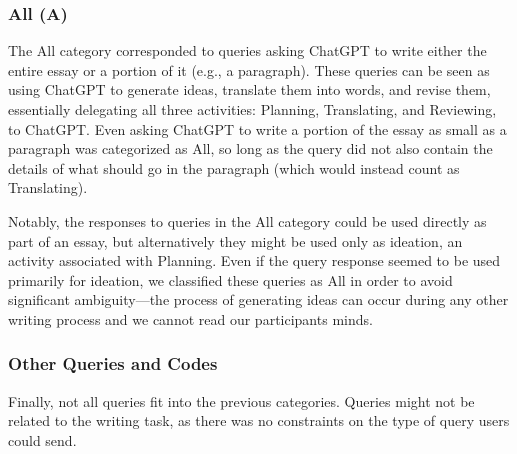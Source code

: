 \documentclass[manuscript,screen,acmsmall]{acmart}
\begin{document}
         
\subsubsection{All (A)}
The All category corresponded to queries asking ChatGPT to write either the entire essay or a portion of it (e.g., a paragraph).
These queries can be seen as using ChatGPT to generate ideas, translate them into words, and revise them, essentially delegating all three activities: Planning, Translating, and Reviewing, to ChatGPT.
Even asking ChatGPT to write a portion of the essay as small as a paragraph was categorized as All, so long as the query did not also contain the details of what should go in the paragraph (which would instead count as Translating).

Notably, the responses to queries in the All category could be used directly as part of an essay, but alternatively they might be used only as ideation, an activity associated with Planning.
Even if the query response seemed to be used primarily for ideation, we classified these queries as All in order to avoid significant ambiguity---the process of generating ideas can occur during any other writing process and we cannot read our participants minds.


        

\subsubsection{Other Queries and Codes}
Finally, not all queries fit into the previous categories.
Queries might not be related to the writing task, as there was no constraints on the type of query users could send.
\end{document}
